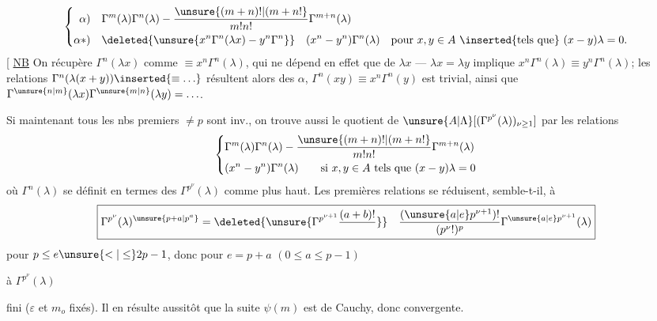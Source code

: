 \[
\left\{\begin{aligned}
\alpha)\quad&\Gamma^m(\lambda)\Gamma^n(\lambda)-\frac{\unsure{(m+n)!|(m+n!}}{m!n!}\Gamma^{m+n}(\lambda)\\
\alpha*)\quad&\deleted{\unsure{x^n\Gamma^n(\lambda x)-y^n\Gamma^n}}\quad(x^n-y^n)\Gamma^n(\lambda)\quad\text{pour }x,y\in A\ \inserted{\text{tels que}}\ (x-y)\lambda=0.
\end{aligned}\right.
\]
[ \uline{NB} On récupère $\Gamma^n(\lambda x)$ comme $\equiv x^n\Gamma^n(\lambda)$,
qui  ne dépend en effet que de $\lambda x$ ---   $\lambda x=\lambda y$ implique $x^n\Gamma^n(\lambda)\equiv y^n\Gamma^n(\lambda)$;
les relations $\Gamma^n(\lambda(x+y))\inserted{\equiv\ldots}$ résultent alors des $\alpha$,
$\Gamma^n(xy)\equiv x^n\Gamma^n(y)$ est trivial, ainsi que $\Gamma^{\unsure{n|m}}(\lambda x)\Gamma^{\unsure{m|n}}(\lambda y)=\ldots$.

Si maintenant tous les nbs premiers $\ne p$ sont inv., on trouve aussi le quotient de $\unsure{A|\Lambda}[(\Gamma^{p^\nu}(\lambda))_{\nu\geq1}]$ par les relations
\[
\left\{\begin{aligned}
&\Gamma^m(\lambda)\Gamma^n(\lambda)-\frac{\unsure{(m+n)!|(m+n!}}{m!n!}\Gamma^{m+n}(\lambda)\\
&(x^n-y^n)\Gamma^n(\lambda)\qquad\text{si }x,y\in A\text{ tels que }(x-y)\lambda=0
\end{aligned}\right.
\]
où $\Gamma^n(\lambda)$ se définit en termes des $\Gamma^{p^\nu}(\lambda)$ comme plus haut. Les premières relations se réduisent, semble-t-il, à
\[
\boxed{\Gamma^{p^\nu}(\lambda)^{\unsure{p+a|p^a}}=\deleted{\unsure{\Gamma^{p^{\nu+1}}\frac{(a+b)!}{}}}\quad\frac{(\unsure{a|e}p^{\nu+1})!}{(p^\nu!)^p}\Gamma^{\unsure{a|e}p^{\nu+1}}(\lambda)}
\]
pour $p\leq e\unsure{<|\leq}2p-1$, donc pour $e=p+a$ $(0\leq a\leq p-1)$

à $\Gamma^{p^\nu}(\lambda)$


fini ($\varepsilon$ et $m_o$ fixés). Il en résulte aussitôt que la suite $\psi(m)$ est de Cauchy, donc convergente.

